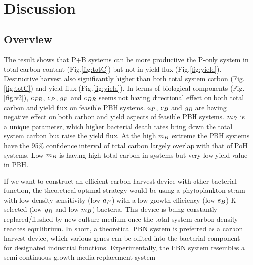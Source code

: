 \documentclass[../thesis.tex]{subfiles} %
\begin{document}
\section{Discussion}
\subsection{Overview}
The result shows that P+B systems can be more productive the P-only system in total carbon content (Fig.\ref{fig:totC}) but not in yield flux (Fig.\ref{fig:yield}).  Destructive harvest also significantly higher than both total system carbon (Fig.\ref{fig:totC}) and yield flux (Fig.\ref{fig:yield}).  In terms of biological components (Fig.\ref{fig:v2}), $e_{PR}$, $e_P$, $g_P$ and $e_{BR}$ seems not having directional effect on both total carbon and yield flux on feasible PBH systems.  $a_P$, $e_B$ and $g_B$ are having negative effect on both carbon and yield aspects of feasible PBH systems.  $m_B$ is a unique parameter, which higher bacterial death rates bring down the total system carbon but raise the yield flux.  At the high $m_B$ extreme the PBH systems have the 95\% confidence interval of total carbon largely overlap with that of PoH systems.  Low $m_B$ is having high total carbon in systems but very low yield value in PBH.

If we want to construct an efficient carbon harvest device with other bacterial function, the theoretical optimal strategy would be using a phytoplankton strain with low density sensitivity (low $a_P$) with a low growth efficiency (low $e_B$) K-selected (low $g_B$ and low $m_B$) bacteria.  This device is being constantly replaced/flushed by new culture medium once the total system carbon density reaches equilibrium.  In short, a theoretical PBN system is preferred as a carbon harvest device, which various genes can be edited into the bacterial component for designated industrial functions.  Experimentally, the PBN system resembles a semi-continuous growth media replacement system.\autocite{aytekin2016statistical}
\end{document}
